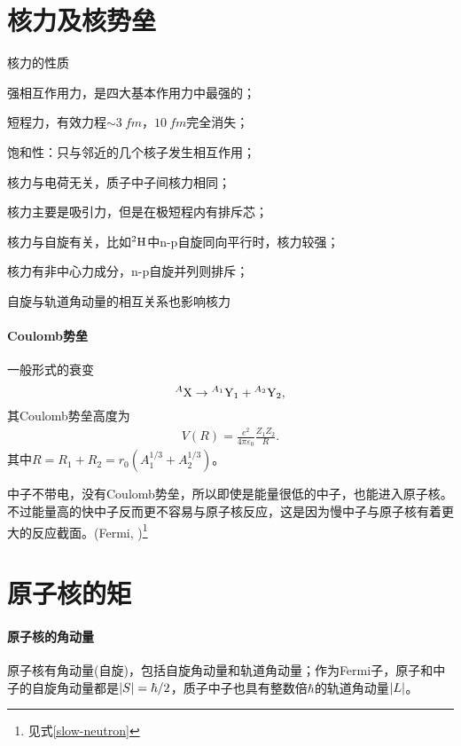 \section{核力及核势垒}
\begin{theorem}{核力的性质}{}
	\begin{compactenum}
		\item 强相互作用力，是四大基本作用力中最强的；
		\item 短程力，有效力程$\sim\SI{3}{fm}$，$\SI{10}{fm}$完全消失；
		\item 饱和性：只与邻近的几个核子发生相互作用；
		\item 核力与电荷无关，质子中子间核力相同；
		\item 核力主要是吸引力，但是在极短程内有排斥芯；
		\item 核力与自旋有关，比如${^{2}\mathrm{H}}$中n-p自旋同向平行时，核力较强；
		\item 核力有非中心力成分，n-p自旋并列则排斥；
		\item 自旋与轨道角动量的相互关系也影响核力
	\end{compactenum}
\end{theorem}
\paragraph{Coulomb势垒}
一般形式的衰变
\[
	{^{A}\mathrm{X}}\to{^{A_1}\mathrm{Y_1}}+{^{A_2}\mathrm{Y_2}},
\]
其Coulomb势垒高度为
\begin{align}
	V(R)=\frac{e^2}{4\pi\varepsilon_0}\frac{Z_1Z_2}{R}.
\end{align}
其中$R=R_1+R_2=r_0(A_1^{1/3}+A_2^{1/3})$。

中子不带电，没有Coulomb势垒，所以即使是能量很低的中子，也能进入原子核。
不过能量高的快中子反而更不容易与原子核反应，这是因为慢中子与原子核有着更大的反应截面。(Fermi, )\footnote{见式\eqref{slow-neutron}}

\section{原子核的矩}

\paragraph{原子核的角动量}原子核有角动量(自旋)，包括自旋角动量和轨道角动量；作为Fermi子，原子和中子的自旋角动量都是$\left\lvert S\right\rvert=\hbar/2$，质子中子也具有整数倍$\hbar$的轨道角动量$\left\lvert L\right\rvert$。

